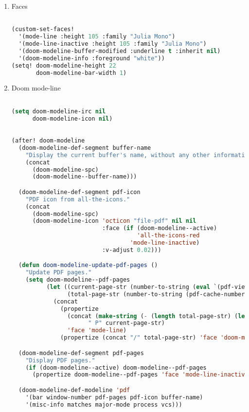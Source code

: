 \documentclass[11pt]{article}
\begin{document}
\begin{enumerate}
  \item Faces
  \label{sec:faces}

  \begin{lstlisting}[language=Lisp]%! Someone please complete this list for me

(custom-set-faces!
  '(mode-line :height 105 :family "Julia Mono")
  '(mode-line-inactive :height 105 :family "Julia Mono")
  '(doom-modeline-buffer-modified :underline t :inherit nil)
  '(doom-modeline-info :foreground "white"))
(setq! doom-modeline-height 22
       doom-modeline-bar-width 1)
\end{lstlisting}
  \item Doom mode-line
  \label{sec:doom-mode-line}

  \begin{lstlisting}[language=Lisp]%! Someone please complete this list for me

(setq doom-modeline-irc nil
      doom-modeline-icon nil)
\end{lstlisting}

\begin{lstlisting}[language=Lisp]%! Someone please complete this list for me

(after! doom-modeline
  (doom-modeline-def-segment buffer-name
    "Display the current buffer's name, without any other information."
    (concat
      (doom-modeline-spc)
      (doom-modeline--buffer-name)))

  (doom-modeline-def-segment pdf-icon
    "PDF icon from all-the-icons."
    (concat
      (doom-modeline-spc)
      (doom-modeline-icon 'octicon "file-pdf" nil nil
                          :face (if (doom-modeline--active)
                                    'all-the-icons-red
                                  'mode-line-inactive)
                          :v-adjust 0.02)))

  (defun doom-modeline-update-pdf-pages ()
    "Update PDF pages."
    (setq doom-modeline--pdf-pages
          (let ((current-page-str (number-to-string (eval `(pdf-view-current-page))))
                (total-page-str (number-to-string (pdf-cache-number-of-pages))))
            (concat
              (propertize
                (concat (make-string (- (length total-page-str) (length current-page-str)) 32)
                      " P" current-page-str)
                'face 'mode-line)
              (propertize (concat "/" total-page-str) 'face 'doom-modeline-buffer-minor-mode)))))

  (doom-modeline-def-segment pdf-pages
    "Display PDF pages."
    (if (doom-modeline--active) doom-modeline--pdf-pages
      (propertize doom-modeline--pdf-pages 'face 'mode-line-inactive)))

  (doom-modeline-def-modeline 'pdf
    '(bar window-number pdf-pages pdf-icon buffer-name)
    '(misc-info matches major-mode process vcs)))

\end{lstlisting}
\end{enumerate}
\end{document}
